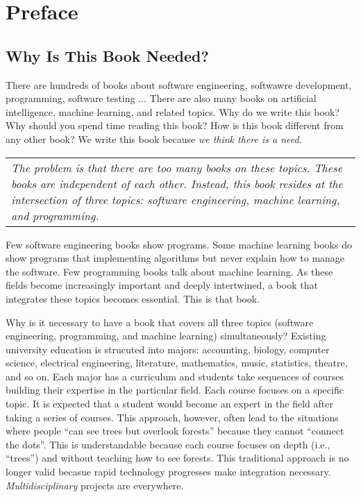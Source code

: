 \chapter*{Preface}

\section*{Why Is This Book Needed?}

There are hundreds of books about software engineering, softwawre
development, programming, software testing ...  There are also many
books on artificial intelligence, machine learning, and related
topics.  Why do we write this book?  Why should you spend time reading
this book?  How is this book different from any other book?  We write
this book because {\it we think there is a need.}



\begin{tabular}{|p{4in}|}
  {\it The problem is that there are too many books on these topics.
    These books are independent of each other.  Instead, this book
    resides at the intersection of three topics: software engineering,
    machine learning, and programming.  }
\end{tabular}  

Few software engineering books show programs. Some machine learning
books do show programs that implementing algorithms but never explain
how to manage the software.  Few programming books talk about machine
learning.  As these fields become increasingly important and deeply
intertwined, a book that integrates these topics becomes essential.
This is that book.

Why is it necessary to have a book that covers all three topics
(software engineering, programming, and machine learning)
simultaneously?  Existing university education is strucuted into
majors: accounting, biology, computer science, electrical engineering,
literature, mathematics, music, statistics, theatre, and so on.  Each
major has a curriculum and students take sequences of courses building
their expertise in the particular field. Each course focuses on a
specific topic.  It is expected that a student would become an expert
in the field after taking a series of courses.  This approach,
however, often lead to the situations where people ``can see trees but
overlook forests'' because they cannot ``connect the dots''.  This is
understandable because each course focuses on depth (i.e., ``trees'')
and without teaching how to see forests.  This traditional approach is
no longer valid becasue rapid technology progresses make integration
necessary.  {\it Multidisciplinary} projects are everywhere.

